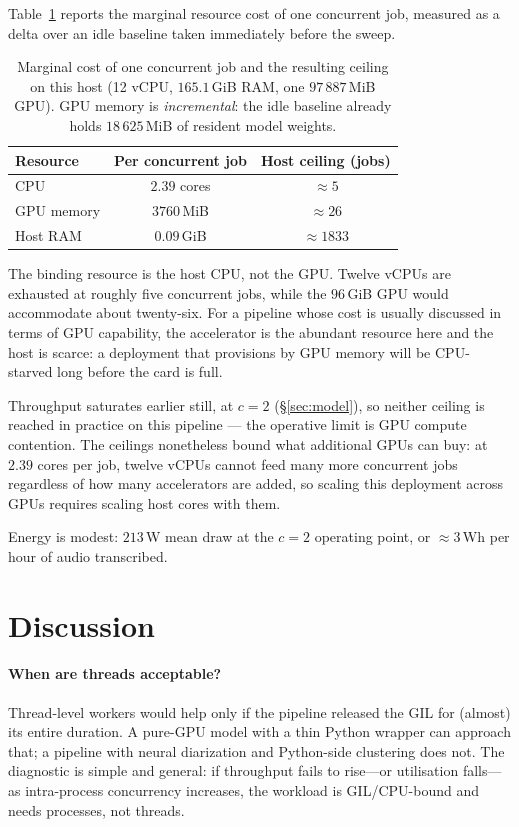 \documentclass[10pt]{article}
\begin{document}
Table~\ref{tab:capacity} reports the marginal resource cost of one concurrent
job, measured as a delta over an idle baseline taken immediately before the
sweep.

\begin{table}[t]
\centering
\caption{Marginal cost of one concurrent job and the resulting ceiling on this
host (12 vCPU, $165.1$\,GiB RAM, one $97\,887$\,MiB GPU). GPU memory is
\emph{incremental}: the idle baseline already holds $18\,625$\,MiB of resident
model weights.}
\label{tab:capacity}
\begin{tabular}{lcc}
\toprule
Resource & Per concurrent job & Host ceiling (jobs) \\
\midrule
CPU           & $2.39$ cores   & $\approx 5$ \\
GPU memory    & $3760$\,MiB    & $\approx 26$ \\
Host RAM      & $0.09$\,GiB    & $\approx 1833$ \\
\bottomrule
\end{tabular}
\end{table}

The binding resource is the host CPU, not the GPU. Twelve vCPUs are exhausted
at roughly five concurrent jobs, while the $96$\,GiB GPU would accommodate
about twenty-six. For a pipeline whose cost is usually discussed in terms of
GPU capability, the accelerator is the abundant resource here and the host is
scarce: a deployment that provisions by GPU memory will be CPU-starved long
before the card is full.

Throughput saturates earlier still, at $c=2$ (\S\ref{sec:model}), so neither
ceiling is reached in practice on this pipeline --- the operative limit is GPU
compute contention. The ceilings nonetheless bound what additional GPUs can
buy: at $2.39$ cores per job, twelve vCPUs cannot feed many more concurrent
jobs regardless of how many accelerators are added, so scaling this deployment
across GPUs requires scaling host cores with them.

Energy is modest: $213$\,W mean draw at the $c=2$ operating point, or
$\approx 3$\,Wh per hour of audio transcribed.

\section{Discussion}
\label{sec:discussion}

\paragraph{When are threads acceptable?} Thread-level workers would help only if
the pipeline released the GIL for (almost) its entire duration. A pure-GPU model
with a thin Python wrapper can approach that; a pipeline with neural diarization
and Python-side clustering does not. The diagnostic is simple and general: if
throughput fails to rise---or utilisation falls---as intra-process concurrency
increases, the workload is GIL/CPU-bound and needs processes, not threads.
\end{document}
